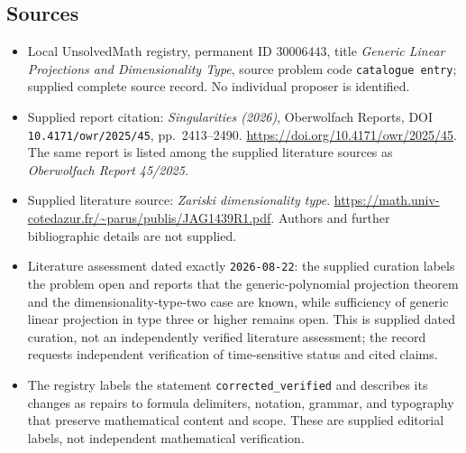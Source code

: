 \documentclass[11pt]{article}
\begin{document}
\subsection{Sources}
\begin{itemize}
\item Local UnsolvedMath registry, permanent ID \(30006443\), title \emph{Generic Linear Projections and Dimensionality Type}, source problem code \texttt{catalogue entry}; supplied complete source record. No individual proposer is identified.
\item Supplied report citation: \emph{Singularities (2026)}, Oberwolfach Reports, DOI \texttt{10.4171/owr/2025/45}, pp.\ 2413--2490. \url{https://doi.org/10.4171/owr/2025/45}. The same report is listed among the supplied literature sources as \emph{Oberwolfach Report 45/2025}.
\item Supplied literature source: \emph{Zariski dimensionality type}. \url{https://math.univ-cotedazur.fr/~parus/publis/JAG1439R1.pdf}. Authors and further bibliographic details are not supplied.
\item Literature assessment dated exactly \texttt{2026-08-22}: the supplied curation labels the problem open and reports that the generic-polynomial projection theorem and the dimensionality-type-two case are known, while sufficiency of generic linear projection in type three or higher remains open. This is supplied dated curation, not an independently verified literature assessment; the record requests independent verification of time-sensitive status and cited claims.
\item The registry labels the statement \texttt{corrected\_verified} and describes its changes as repairs to formula delimiters, notation, grammar, and typography that preserve mathematical content and scope. These are supplied editorial labels, not independent mathematical verification.
\end{itemize}
\end{document}
